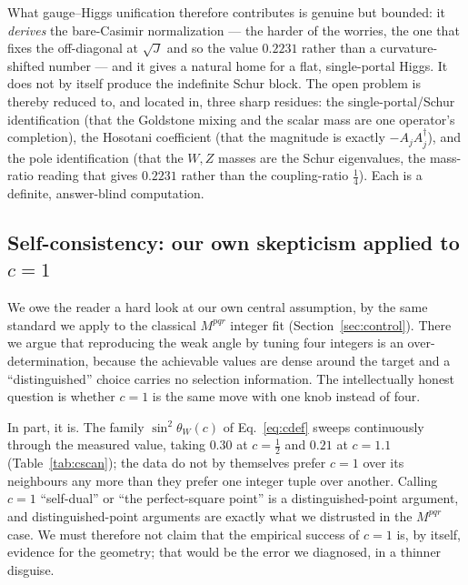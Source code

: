 \documentclass[11pt]{article}
\theoremstyle{plain}
\theoremstyle{definition}
\begin{document}
What gauge--Higgs unification therefore contributes is genuine but bounded:
it \emph{derives} the bare-Casimir normalization --- the harder of the
worries, the one that fixes the off-diagonal at $\sqrt J$ and so the value
$0.2231$ rather than a curvature-shifted number --- and it gives a natural
home for a flat, single-portal Higgs. It does not by itself produce the
indefinite Schur block. The open problem is thereby reduced to, and located
in, three sharp residues: the single-portal/Schur identification (that the
Goldstone mixing and the scalar mass are one operator's completion), the
Hosotani coefficient (that the magnitude is exactly $-A_jA_j^\dagger$), and
the pole identification (that the $W,Z$ masses are the Schur eigenvalues, the
mass-ratio reading that gives $0.2231$ rather than the coupling-ratio
$\tfrac14$). Each is a definite, answer-blind computation.

\subsection{Self-consistency: our own skepticism applied to $c=1$}
\label{sec:selfconsistency}

We owe the reader a hard look at our own central assumption, by the same
standard we apply to the classical $M^{pqr}$ integer fit
(Section~\ref{sec:control}). There we argue that reproducing the weak angle by
tuning four integers is an over-determination, because the achievable values
are dense around the target and a ``distinguished'' choice carries no
selection information. The intellectually honest question is whether $c=1$ is
the same move with one knob instead of four.

In part, it is. The family $\sin^2\theta_W(c)$ of Eq.~\eqref{eq:cdef} sweeps
continuously through the measured value, taking $0.30$ at $c=\tfrac12$ and
$0.21$ at $c=1.1$ (Table~\ref{tab:cscan}); the data do not by themselves
prefer $c=1$ over its neighbours any more than they prefer one integer tuple
over another. Calling $c=1$ ``self-dual'' or ``the perfect-square point'' is a
distinguished-point argument, and distinguished-point arguments are exactly
what we distrusted in the $M^{pqr}$ case. We must therefore not claim that the
empirical success of $c=1$ is, by itself, evidence for the geometry; that
would be the error we diagnosed, in a thinner disguise.
\end{document}
